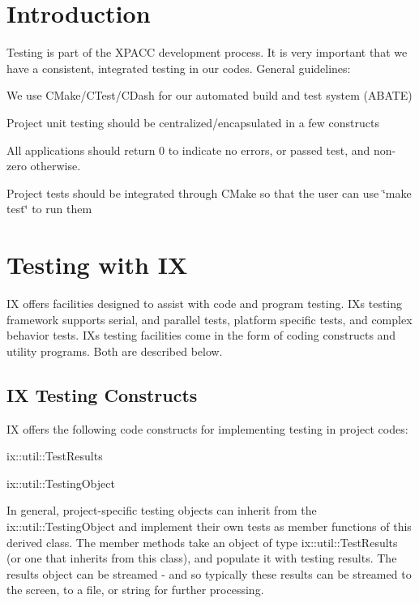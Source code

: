 \hypertarget{testingproject_guide_testing_intro}{}\section{Introduction}\label{testingproject_guide_testing_intro}
Testing is part of the X\+P\+A\+CC development process. It is very important that we have a consistent, integrated testing in our codes. General guidelines\+:
\begin{DoxyItemize}
\item We use C\+Make/\+C\+Test/\+C\+Dash for our automated build and test system (A\+B\+A\+TE)
\item Project unit testing should be centralized/encapsulated in a few constructs
\item All applications should return 0 to indicate no errors, or passed test, and non-\/zero otherwise.
\item Project tests should be integrated through C\+Make so that the user can use \char`\"{}make test\char`\"{} to run them
\end{DoxyItemize}\hypertarget{testingproject_guide_testing_constructs_sec}{}\section{Testing with IX}\label{testingproject_guide_testing_constructs_sec}
IX offers facilities designed to assist with code and program testing. IX\textquotesingle{}s testing framework supports serial, and parallel tests, platform specific tests, and complex behavior tests. IX\textquotesingle{}s testing facilities come in the form of coding constructs and utility programs. Both are described below. \hypertarget{testingproject_guide_ix_testing_code}{}\subsection{I\+X Testing Constructs}\label{testingproject_guide_ix_testing_code}
IX offers the following code constructs for implementing testing in project codes\+:
\begin{DoxyItemize}
\item ix\+::util\+::\+Test\+Results
\item ix\+::util\+::\+Testing\+Object
\end{DoxyItemize}

In general, project-\/specific testing objects can inherit from the ix\+::util\+::\+Testing\+Object and implement their own tests as member functions of this derived class. The member methods take an object of type ix\+::util\+::\+Test\+Results (or one that inherits from this class), and populate it with testing results. The results object can be streamed -\/ and so typically these results can be streamed to the screen, to a file, or string for further processing.

